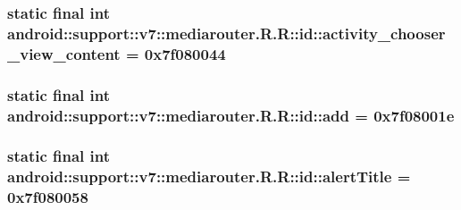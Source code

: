 \hypertarget{classandroid_1_1support_1_1v7_1_1mediarouter_1_1_r_1_1id_fbc9ad7dbd0b88b4d4952bae59b167dd}{
\subsubsection[{activity\_\-chooser\_\-view\_\-content}]{\setlength{\rightskip}{0pt plus 5cm}static final int android::support::v7::mediarouter.R.R::id::activity\_\-chooser\_\-view\_\-content = 0x7f080044}}
\label{classandroid_1_1support_1_1v7_1_1mediarouter_1_1_r_1_1id_fbc9ad7dbd0b88b4d4952bae59b167dd}


\hypertarget{classandroid_1_1support_1_1v7_1_1mediarouter_1_1_r_1_1id_f9e76a574586f17d8b8d711e86ff3f12}{
\subsubsection[{add}]{\setlength{\rightskip}{0pt plus 5cm}static final int android::support::v7::mediarouter.R.R::id::add = 0x7f08001e}}
\label{classandroid_1_1support_1_1v7_1_1mediarouter_1_1_r_1_1id_f9e76a574586f17d8b8d711e86ff3f12}


\hypertarget{classandroid_1_1support_1_1v7_1_1mediarouter_1_1_r_1_1id_6e34a8ef953297e6d8ac1973ba096cee}{
\subsubsection[{alertTitle}]{\setlength{\rightskip}{0pt plus 5cm}static final int android::support::v7::mediarouter.R.R::id::alertTitle = 0x7f080058}}
\label{classandroid_1_1support_1_1v7_1_1mediarouter_1_1_r_1_1id_6e34a8ef953297e6d8ac1973ba096cee}


